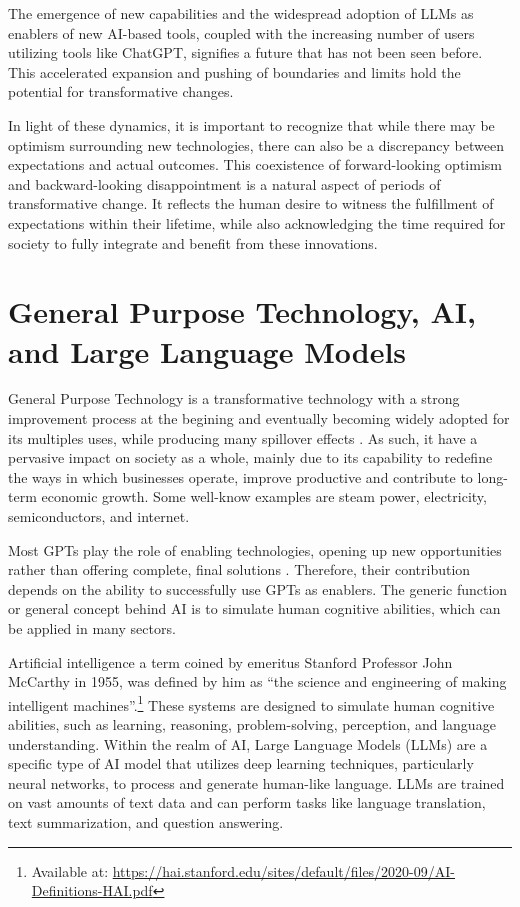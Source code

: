 \documentclass[preprint, 1p,
authoryear]{elsarticle} %
\begin{document}
The emergence of new capabilities and the widespread adoption of LLMs as
enablers of new AI-based tools, coupled with the increasing number of
users utilizing tools like ChatGPT, signifies a future that has not been
seen before. This accelerated expansion and pushing of boundaries and
limits hold the potential for transformative changes.

In light of these dynamics, it is important to recognize that while
there may be optimism surrounding new technologies, there can also be a
discrepancy between expectations and actual outcomes. This coexistence
of forward-looking optimism and backward-looking disappointment is a
natural aspect of periods of transformative change. It reflects the
human desire to witness the fulfillment of expectations within their
lifetime, while also acknowledging the time required for society to
fully integrate and benefit from these innovations.

\hypertarget{general-purpose-technology-ai-and-large-language-models}{%
\section{General Purpose Technology, AI, and Large Language
Models}\label{general-purpose-technology-ai-and-large-language-models}}

General Purpose Technology is a transformative technology with a strong
improvement process at the begining and eventually becoming widely
adopted for its multiples uses, while producing many spillover effects
\citep{paradox}. As such, it have a pervasive impact on society as a
whole, mainly due to its capability to redefine the ways in which
businesses operate, improve productive and contribute to long-term
economic growth. Some well-know examples are steam power, electricity,
semiconductors, and internet.

Most GPTs play the role of enabling technologies, opening up new
opportunities rather than offering complete, final solutions
\citep{enginesofgrowth}. Therefore, their contribution depends on the
ability to successfully use GPTs as enablers. The generic function or
general concept behind AI is to simulate human cognitive abilities,
which can be applied in many sectors.

Artificial intelligence a term coined by emeritus Stanford Professor
John McCarthy in 1955, was defined by him as ``the science and
engineering of making intelligent machines''.\footnote{Available at:
  \url{https://hai.stanford.edu/sites/default/files/2020-09/AI-Definitions-HAI.pdf}}
These systems are designed to simulate human cognitive abilities, such
as learning, reasoning, problem-solving, perception, and language
understanding. Within the realm of AI, Large Language Models (LLMs) are
a specific type of AI model that utilizes deep learning techniques,
particularly neural networks, to process and generate human-like
language. LLMs are trained on vast amounts of text data and can perform
tasks like language translation, text summarization, and question
answering.
\end{document}
